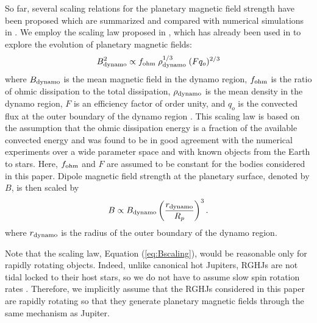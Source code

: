 \documentclass[iop,numberedappendix,apj]{emulateapj}
\begin{document}
So far, several scaling relations for the planetary magnetic field strength  
have been proposed \citep[e.g.][]{russel1978,busse1976,stevenson1979,mizutani1992,sano1993,starchenko2002,christensen2006,christensen_et_al2009}  
which are summarized and compared with numerical simulations in \citet{christensen2010}. 
We employ the scaling law proposed in \citet{christensen_et_al2009}, which has already been used in \citet{reiners2010} to explore the evolution of planetary magnetic fields:
\begin{equation}
B_{\rm dynamo} ^2 \propto f_{\rm ohm}\;\rho_{\rm dynamo}^{1/3} \;  (Fq_o)^{2/3} \label{eq:Bscaling} 
\end{equation}
where $B_{\rm dynamo}$ is the mean magnetic field in the dynamo region, $f_{\rm ohm}$ is the ratio of ohmic dissipation to the total dissipation, $\rho_{\rm dynamo} $ is the mean density in the dynamo region, $F$ is an efficiency factor of order unity, and $q_o$ is the convected flux at the outer boundary of the dynamo region \citep[see][for the comprehensive description]{christensen_et_al2009}. 
This scaling law is based on the assumption that the ohmic dissipation energy is a fraction of the available convected energy and was found to be in good agreement with the numerical experiments over a wide parameter space and with known objects from the Earth to stars. 
Here, $f_{\rm ohm}$ and $F$ are assumed to be constant for the bodies considered in this paper. 
Dipole magnetic field strength at the planetary surface, denoted by $B$, is then scaled by
\begin{equation}
B \propto B_{\rm dynamo} \left( \frac{r_{\rm dynamo}}{R_p} \right)^3.  \label{eq:Bscaling2}
\end{equation}
where $r_{\rm dynamo}$ is the radius of the outer boundary of the dynamo region. 

Note that the scaling law, Equation (\ref{eq:Bscaling}), would be reasonable only for rapidly rotating objects.
Indeed, unlike canonical hot Jupiters, RGHJs are not tidal locked to their host stars, so we do not have to assume slow spin rotation rates \citep{spiegel+madhusudhan2012}.
Therefore, we implicitly assume that the RGHJs considered in this paper are rapidly rotating so that they generate planetary magnetic fields through the same mechanism as Jupiter. 
\end{document}
